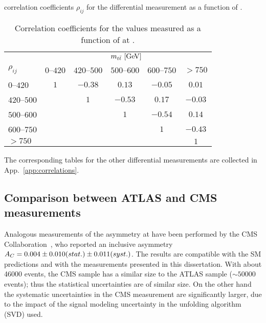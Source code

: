 correlation coefficients $\rho_{ij}$ for the differential \ac{}
measurement as a function of \mtt{}.
\begin{table}[!htp]\centering
\begin{tabular}{l c c c c c }
  \toprule
  &\multicolumn{5}{c}{$m_{t\bar{t}}{}~[\rm{GeV}]$}    \\
  $\rho_{ij}$ & $0$--$420$ & $420$--$500$ & $500$--$600$ & $600$--$750$ & $>750$ \\
  \midrule
  $0$--$420$      & $1$ & $-0.38$ & $0.13$  & $-0.05$ & $0.01$  \\
  $420$--$500$    &     & $1$     & $-0.53$ & $0.17$  & $-0.03$ \\
  $500$--$600$    &     &         & $1$     & $-0.54$ & $0.14$  \\
  $600$--$750$    &     &         &         & $1$     & $-0.43$ \\
  $>750$          &     &         &         &         & $1$     \\
  \bottomrule
\end{tabular}
\caption{Correlation coefficients for the \ac{} values measured as a
  function of \mtt{} at \seventev{}.} 
\label{tab:corr_mtt}
\end{table}
The corresponding tables for the other differential measurements are
collected in App.~\ref{app:correlations}.

\subsection{Comparison between ATLAS and CMS measurements}

Analogous measurements of the asymmetry \ac{} at \seventev{} have been
performed by the CMS Collaboration~\cite{Chatrchyan:2012cxa}, who
reported an inclusive asymmetry
$A_C{}=0.004\pm0.010(stat.)\pm0.011(syst.)$.
The results are compatible with the SM predictions and with the
measurements presented in this dissertation. 
With about 46000 \ttbar{} events, the CMS sample has a similar size to the
ATLAS sample ($\sim50000$ events); thus the statistical uncertainties are
of similar size. On the other hand the systematic uncertainties in the CMS
measurement are significantly larger, due to the impact of the signal
modeling uncertainty in the unfolding algorithm (SVD) used.

